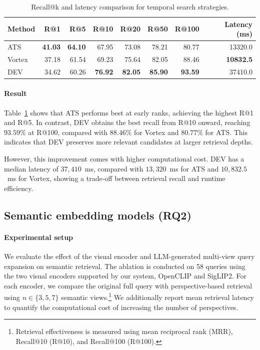 \documentclass[runningheads]{llncs}
\begin{document}
\begin{table}[t]
    \centering
    \caption{Recall@k and latency comparison for temporal search strategies.}
    \label{tab:temporal-recall}
    \small
    \setlength{\tabcolsep}{4pt}
    \begin{tabular}{lrrrrrrr}
        \toprule
        Method & R@1 & R@5 & R@10 & R@20 & R@50 & R@100 & Latency (ms) \\
        \midrule
        ATS
        & \textbf{41.03}
        & \textbf{64.10}
        & 67.95
        & 73.08
        & 78.21
        & 80.77
        & 13320.0 \\

        Vortex
        & 37.18
        & 61.54
        & 69.23
        & 75.64
        & 82.05
        & 88.46
        & \textbf{10832.5} \\

        DEV
        & 34.62
        & 60.26
        & \textbf{76.92}
        & \textbf{82.05}
        & \textbf{85.90}
        & \textbf{93.59}
        & 37410.0 \\
        \bottomrule
    \end{tabular}
\end{table}


\paragraph{Result}
Table~\ref{tab:temporal-recall} shows that ATS performs best at early
ranks, achieving the highest R@1 and R@5. In contrast, DEV obtains the
best recall from R@10 onward, reaching $93.59\%$ at R@100, compared
with $88.46\%$ for Vortex and $80.77\%$ for ATS. This indicates that
DEV preserves more relevant candidates at larger retrieval depths.

However, this improvement comes with higher computational cost.
DEV has a median latency of $37{,}410$~ms, compared with
$13{,}320$~ms for ATS and $10{,}832.5$~ms for Vortex, showing a
trade-off between retrieval recall and runtime efficiency.



\subsection{Semantic embedding models (RQ2)}

\paragraph{Experimental setup} We evaluate the effect of the visual encoder and LLM-generated
multi-view query expansion on semantic retrieval. The ablation
is conducted on 58 queries using the two visual encoders supported by
our system, OpenCLIP and SigLIP2. For each encoder, we compare the
original full query with perspective-based retrieval using
$n \in \{3,5,7\}$ semantic views.\footnote{Retrieval effectiveness is measured
using mean reciprocal rank (MRR), Recall@10 (R@10), and Recall@100
(R@100).} We additionally report mean retrieval latency to quantify the
computational cost of increasing the number of perspectives.
\end{document}
